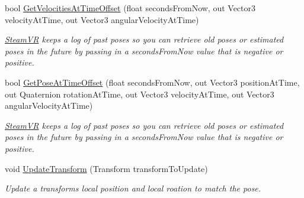 \begin{DoxyCompactItemize}
bool \mbox{\hyperlink{class_valve_1_1_v_r_1_1_steam_v_r___action___pose___source_a303a6f2c6b8f893f0a7776d5edcbd632}{Get\+Velocities\+At\+Time\+Offset}} (float seconds\+From\+Now, out Vector3 velocity\+At\+Time, out Vector3 angular\+Velocity\+At\+Time)
\begin{DoxyCompactList}\small\item\em \mbox{\hyperlink{class_valve_1_1_v_r_1_1_steam_v_r}{Steam\+VR}} keeps a log of past poses so you can retrieve old poses or estimated poses in the future by passing in a seconds\+From\+Now value that is negative or positive. \end{DoxyCompactList}\item 
bool \mbox{\hyperlink{class_valve_1_1_v_r_1_1_steam_v_r___action___pose___source_acac4de6fa4feee04ba8050e11716e97a}{Get\+Pose\+At\+Time\+Offset}} (float seconds\+From\+Now, out Vector3 position\+At\+Time, out Quaternion rotation\+At\+Time, out Vector3 velocity\+At\+Time, out Vector3 angular\+Velocity\+At\+Time)
\begin{DoxyCompactList}\small\item\em \mbox{\hyperlink{class_valve_1_1_v_r_1_1_steam_v_r}{Steam\+VR}} keeps a log of past poses so you can retrieve old poses or estimated poses in the future by passing in a seconds\+From\+Now value that is negative or positive. \end{DoxyCompactList}\item 
void \mbox{\hyperlink{class_valve_1_1_v_r_1_1_steam_v_r___action___pose___source_ae38259c05b8d3c9562e025d9efa18002}{Update\+Transform}} (Transform transform\+To\+Update)
\begin{DoxyCompactList}\small\item\em Update a transform\textquotesingle{}s local position and local roation to match the pose. \end{DoxyCompactList}\end{DoxyCompactItemize}
